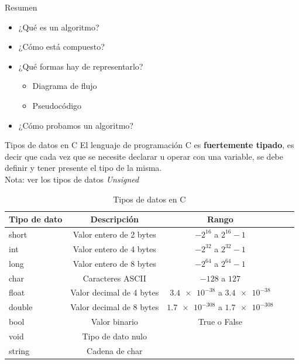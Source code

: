 \documentclass[xcolor=pdftex,table,11pt]{beamer}
\begin{document}
\begin{frame}{Resumen}

\begin{itemize}
\item<1-> ¿Qué es un algoritmo?
\item<2-> ¿Cómo está compuesto?
\item<3-> ¿Qué formas hay de representarlo?
\begin{itemize}
\item<5-> Diagrama de flujo
\item<6-> Pseudocódigo
\end{itemize}
\item<7-> ¿Cómo probamos un algoritmo?
\end{itemize}


\end{frame}




\begin{frame} {Tipos de datos en C}
El lenguaje de programación C es \textbf{fuertemente tipado}, es decir que cada vez que se necesite declarar u operar con una variable, se debe definir y tener presente el tipo de la misma. \\
Nota: ver los tipos de datos \textit{Unsigned}
\begin{table}
\begin{tabular}{l | c | c | c | l }
Tipo de dato & Descripción & Rango  \\
\hline \hline
short & Valor entero de 2 bytes & $-2^{16}$ a $2^{16} -1 $\\ 
int & 	Valor entero de 4 bytes & $-2^{32}$ a $2^{32} -1 $\\ 
long & 	Valor entero de 8 bytes & $-2^{64}$ a $2^{64} -1 $\\ 
char & Caracteres ASCII & $-128 $ a $127$\\ 
float & Valor decimal de 4 bytes & $\num{3.4e-38} $ a $\num{3.4e-38}$\\ 
double & Valor decimal de 8 bytes & $\num{1.7e-308} $ a $\num{1.7e-308}$\\ 
bool & Valor binario &True o False\\ 
void & Tipo de dato nulo &\\ 
 string & Cadena de char  &\\ 
\end{tabular}
\caption{Tipos de datos en C}

\end{table}

\end{frame}
\end{document}
